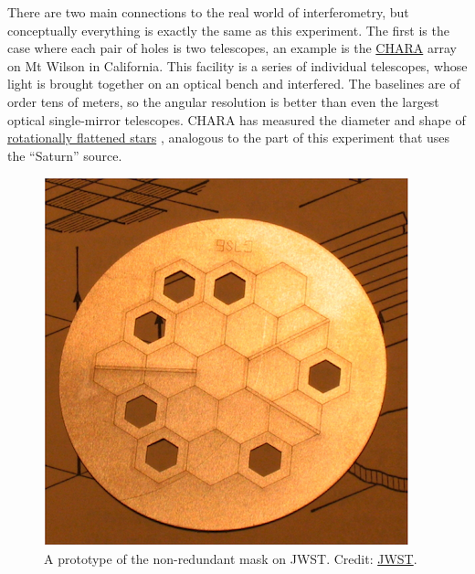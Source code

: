\documentclass[11pt]{article}
\begin{document}
There are two main connections to the real world of interferometry, but conceptually everything is exactly the same as this experiment. The first is the case where each pair of holes is two telescopes, an example is the \href{https://en.wikipedia.org/wiki/CHARA_array}{CHARA} array on Mt Wilson in California. This facility is a series of individual telescopes, whose light is brought together on an optical bench and interfered. The baselines are of order tens of meters, so the angular resolution is better than even the largest optical single-mirror telescopes.
CHARA has measured the diameter and shape of \href{https://www.chara.gsu.edu/science-highlights/rapid-rotators}{rotationally flattened stars} \citep[e.g.][]{2011ApJ...732...68C}, analogous to the part of this experiment that uses the ``Saturn'' source.

\begin{figure}
    \centering
    \includegraphics{doc/NIRISS_AMI.png}
    \caption{A prototype of the non-redundant mask on JWST. Credit: \href{https://jwst-docs.stsci.edu/jwst-near-infrared-imager-and-slitless-spectrograph/niriss-observing-modes/niriss-aperture-masking-interferometry}{JWST}.}
    \label{fig:ami}
\end{figure}
\end{document}
